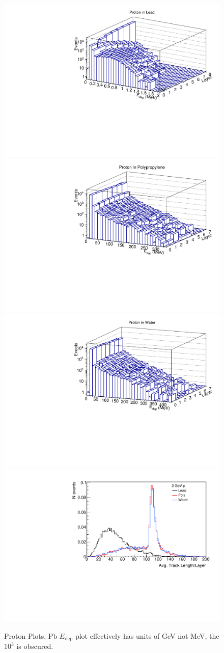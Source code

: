 \documentclass[aps,prd,twocolumn,nofootinbib]{revtex4-1}
\begin{document}
\begin{figure}
  \includegraphics[width=.45\textwidth]{plots/P_pb_edep.pdf}
  \includegraphics[width=.45\textwidth]{plots/P_pp_edep.pdf}
  \includegraphics[width=.45\textwidth]{plots/P_h2o_edep.pdf}
  \includegraphics[width=.45\textwidth]{plots/TL_proton.pdf}
  \caption{Proton Plots, Pb $E_{\text{dep}}$ plot effectively has units of GeV not MeV, the $10^3$ is obscured.}
  \label{fig:p-quant}
\end{figure}
\end{document}
